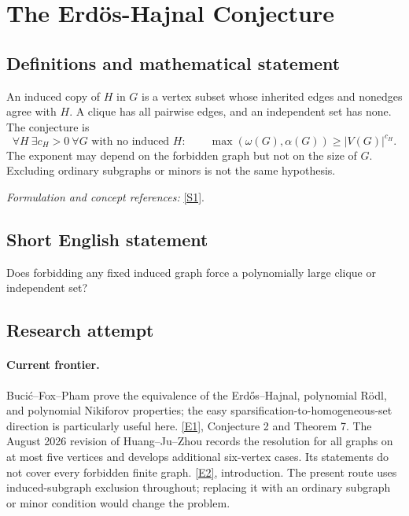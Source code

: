 \documentclass[11pt,a4paper]{article}
\newcommand{\sref}[2]{\hyperlink{source:#1:#2}{[S#2]}}
\newcommand{\eref}[2]{\hyperlink{extra:#1:#2}{[E#2]}}
\newif\ifshowcatalogue
\newcommand{\cataloguescope}[1]{\ifshowcatalogue
 \paragraph{Exact scope in the supplied catalogue.}
 \begin{quote}\small #1\end{quote}\fi}
\numberwithin{equation}{section}
\begin{document}
\setcounter{section}{0}
\clearpage
\section*{\texorpdfstring{The Erdös-Hajnal Conjecture}{The Erdös-Hajnal Conjecture}}\label{statement}
\subsection{Definitions and mathematical statement}
An induced copy of $H$ in $G$ is a vertex subset whose inherited edges and nonedges agree with $H$. A clique has all pairwise edges, and an independent set has none. The conjecture is
\[
 \forall H\ \exists c_H>0\ \forall G\text{ with no induced }H:\qquad
 \max(\omega(G),\alpha(G))\ge |V(G)|^{c_H}.
\]
The exponent may depend on the forbidden graph but not on the size of $G$. Excluding ordinary subgraphs or minors is not the same hypothesis.
\par\smallskip\textit{Formulation and concept references:} \sref{statement}{1}.
\cataloguescope{Prove that for every fixed finite graph H there is a constant c\_H>0 such that every n-vertex graph with no induced subgraph isomorphic to H contains a clique or an independent set of size at least n\textasciicircum{}\{c\_H\}.}
\subsection{Short English statement}
Does forbidding any fixed induced graph force a polynomially large clique or independent set?
\subsection{Research attempt}

\paragraph{Current frontier.}
Buci\'c--Fox--Pham prove the equivalence of the Erd\H{o}s--Hajnal,
polynomial R\"odl, and polynomial Nikiforov properties; the easy
sparsification-to-homogeneous-set direction is particularly useful here.
\eref{statement}{1}, Conjecture 2 and Theorem 7.
The August 2026 revision of Huang--Ju--Zhou records the resolution for
all graphs on at most five vertices and develops additional six-vertex
cases.  Its statements do not cover every forbidden finite graph.
\eref{statement}{2}, introduction.
The present route uses induced-subgraph exclusion throughout; replacing
it with an ordinary subgraph or minor condition would change the problem.
\end{document}
